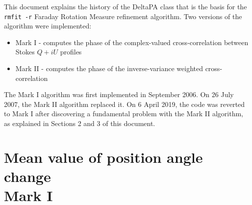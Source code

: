 \documentclass[12pt]{article}
\begin{document}
This document explains the history of the DeltaPA class that is the basis for the {\tt rmfit -r}
Faraday Rotation Measure refinement algorithm.  Two versions of the algorithm were implemented:
%
\begin{itemize}
\item Mark I - computes the phase of the complex-valued cross-correlation between Stokes $Q+iU$ profiles
\item Mark II - computes the phase of the inverse-variance weighted cross-correlation
\end{itemize}

The Mark I algorithm was first implemented in September 2006.   On 26 July 2007, the Mark II algorithm
replaced it.   On 6 April 2019, the code was reverted to Mark I after discovering a fundamental problem
with the Mark II algorithm, as explained in Sections 2 and 3 of this document.

\section{Mean value of position angle change \\ Mark I }
\end{document}
